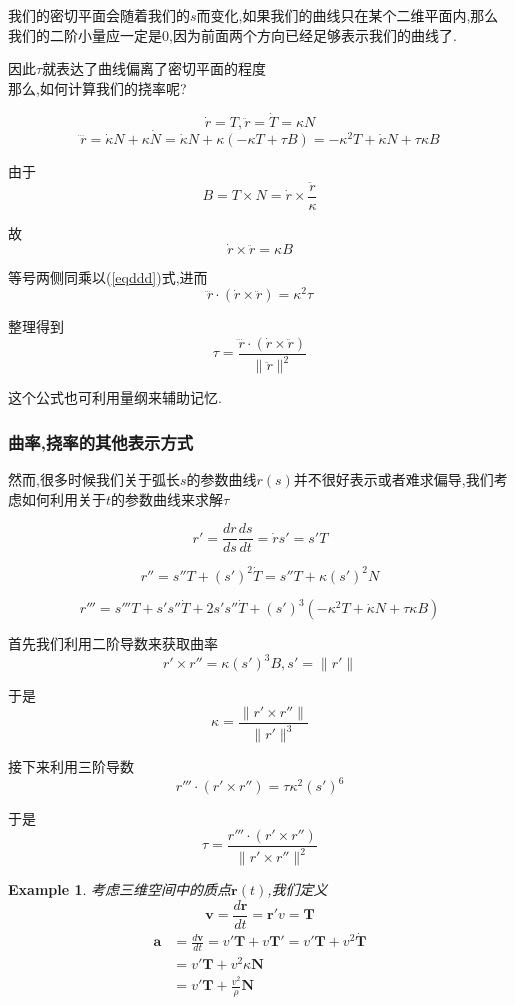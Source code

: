 \documentclass[11pt,hyperref,a4paper,UTF8]{ctexart}
\newtheorem{example}{Example}[subsection]
\newcommand{\ve}{\boldsymbol}
\begin{document}
\begin{CJK}{UTF8}{gkai}
我们的密切平面会随着我们的$s$而变化,如果我们的曲线只在某个二维平面内,那么我们的二阶小量应一定是$0$,因为前面两个方向已经足够表示我们的曲线了.

因此$\tau$就表达了曲线偏离了密切平面的程度\\

那么,如何计算我们的挠率呢?

\[\dot{r} = T,\ddot{r} = \dot{T} = \kappa N\]
\begin{equation}
  \dddot{r} = \dot{\kappa}N + \kappa\dot{N} = \dot{\kappa} N + \kappa(-\kappa T + \tau B) = -\kappa^2 T + \dot{\kappa} N + \tau \kappa B
  \label{eqddd}
\end{equation}

由于
\[B = T\times N = \dot{r} \times \frac{\ddot{r}}{\kappa}\]

故
\[\dot{r}\times \ddot{r} = \kappa B\]

等号两侧同乘以(\ref{eqddd})式,进而
\[\dddot{r} \cdot (\dot{r}\times \ddot{r}) = \kappa^2 \tau\]

整理得到
\[\tau = \frac{\dddot{r} \cdot (\dot{r}\times \ddot{r})}{\|\ddot{r}\|^2}\]

这个公式也可利用量纲来辅助记忆.\\

\subsubsection{曲率,挠率的其他表示方式}
然而,很多时候我们关于弧长$s$的参数曲线$r(s)$并不很好表示或者难求偏导,我们考虑如何利用关于$t$的参数曲线来求解$\tau$

\[r' = \frac{dr}{ds} \frac{ds}{dt} = \dot{r} s' = s' T\]

\[r'' = s'' T + (s')^2 \dot{T} = s'' T + \kappa (s')^2 N\]

\[r''' = s''' T + s' s'' \dot{T} + 2s' s'' \dot{T} + (s')^3 (-\kappa^2 T + \dot{\kappa} N + \tau \kappa B)\]

首先我们利用二阶导数来获取曲率
\[r' \times r'' = \kappa(s')^3 B, s' = \|r'\|\]

于是
\[\kappa = \frac{\|r' \times r''\|}{\|r'\|^3}\]

接下来利用三阶导数
\[r''' \cdot (r' \times r'') = \tau \kappa^2 (s')^6\]

于是
\[\tau = \frac{r''' \cdot (r' \times r'')}{\|r'\times r''\|^2}\]
\begin{example}
  考虑三维空间中的质点$\ve{r}(t)$,我们定义
  \[\ve{v} = \frac{d\ve{r}}{dt} = \ve{r}' v = \ve{T}\]
  \[
  \begin{aligned}  
    \ve{a} &= \frac{d\ve{v}}{dt} = v' \ve{T} + v \ve{T}' = v' \ve{T} + v^2 \dot{\ve{T}}\\
    &= v' \ve{T} + v^2 \kappa \ve{N}\\
    &= v' \ve{T} + \frac{v^2}{\rho} \ve{N}\\
  \end{aligned}  
  \]
\end{example}


\end{CJK}
\end{document}
